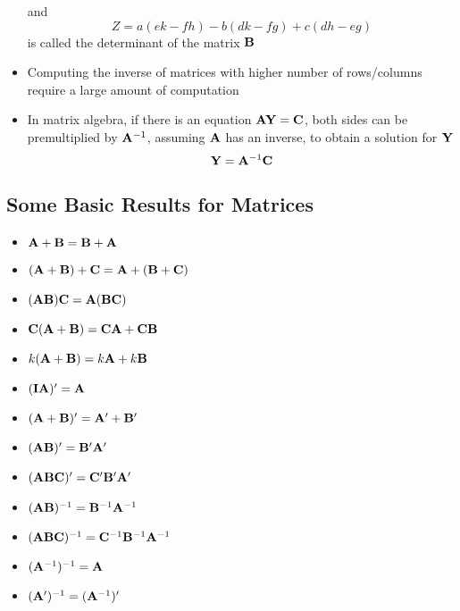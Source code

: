 \begin{itemize}
and $$ Z = a(ek - fh) - b(dk - fg) + c(dh - eg) $$ is called the determinant of the matrix $\mathbf{B}$ 
\item Computing the inverse of matrices with higher number of rows/columns require a large amount of computation
\item In matrix algebra, if there is an equation $\mathbf{AY} = \mathbf{C}$, both sides can be premultiplied by $\mathbf{A}^{-1}$, assuming $\mathbf{A}$ has an inverse, to obtain a solution for $\mathbf{Y}$
$$ \mathbf{Y} = \mathbf{A}^{-1}\mathbf{C} $$ 
\end{itemize}

\subsection{Some Basic Results for Matrices} 
\begin{itemize} 
\item $ \mathbf{A} + \mathbf{B} = \mathbf{B} + \mathbf{A} $ 
\item $ (\mathbf{A} + \mathbf{B}) + \mathbf{C} = \mathbf{A} + (\mathbf{B} + \mathbf{C}) $
\item $ (\mathbf{AB})\mathbf{C} = \mathbf{A}(\mathbf{BC}) $
\item $ \mathbf{C}(\mathbf{A} + \mathbf{B}) = \mathbf{CA} + \mathbf{CB} $
\item $ k(\mathbf{A} + \mathbf{B}) = k\mathbf{A} + k\mathbf{B} $
\item $ (\mathbf{I} \mathbf{A})' = \mathbf{A} $
\item $ (\mathbf{A} + \mathbf{B})' = \mathbf{A}' + \mathbf{B}' $
\item $ (\mathbf{AB})' = \mathbf{B}'\mathbf{A}' $
\item $ (\mathbf{ABC})' = \mathbf{C}' \mathbf{B}' \mathbf{A}' $
\item $ (\mathbf{AB})^{-1} = \mathbf{B}^{-1} \mathbf{A}^{-1} $ 
\item $ (\mathbf{ABC})^{-1} = \mathbf{C}^{-1} \mathbf{B}^{-1} \mathbf{A}^{-1} $ 
\item $ (\mathbf{A}^{-1})^{-1} = \mathbf{A} $ 
\item $ (\mathbf{A}')^{-1} = (\mathbf{A}^{-1})' $ 
\end{itemize} 

